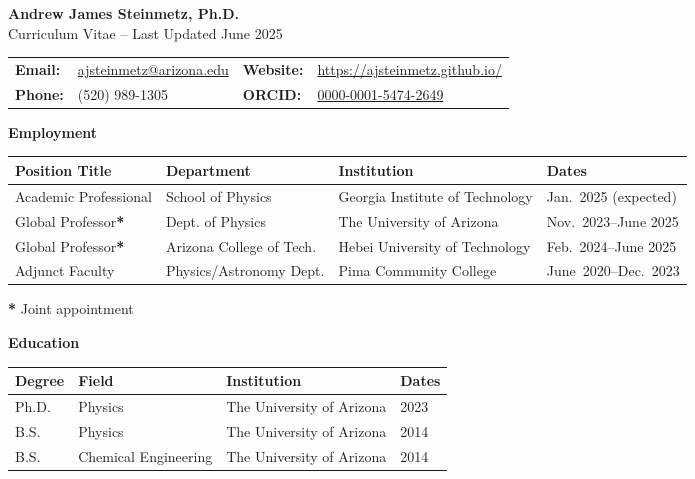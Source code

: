 \documentclass[11pt]{article}
\begin{document}
\begin{center}
    {\Large\textbf{Andrew James Steinmetz, Ph.D.}}\\[0.5em]
    {\large Curriculum Vitae -- Last Updated June 2025}
\end{center}

{\normalsize
\begin{center}
    \begin{tabular}{@{}p{2.0cm} p{5.0cm} p{2.0cm} p{5.0cm}@{}}
        \textbf{Email:} & \href{mailto:ajsteinmetz@arizona.edu}{ajsteinmetz@arizona.edu} &
        \textbf{Website:} & \href{https://ajsteinmetz.github.io/}{https://ajsteinmetz.github.io/} \\
        \textbf{Phone:} & (520) 989-1305 &
        \textbf{ORCID:} & \href{https://orcid.org/0000-0001-5474-2649}{0000-0001-5474-2649} \\
    \end{tabular}
\end{center}
}

\medskip

{\Large\textbf{Employment}}

{\normalsize
\begin{tabular}{@{}p{3.8cm} p{4.4cm} p{5.3cm} p{3.0cm}@{}}
    \toprule
    \textbf{Position Title} & \textbf{Department} & \textbf{Institution} & \textbf{Dates} \\
    \midrule
    Academic Professional & School of Physics & Georgia Institute of Technology & {\footnotesize Jan.~2025 (expected)} \\ 
    Global Professor\textbf{*} & Dept. of Physics & The University of Arizona              & {\footnotesize Nov.~2023--June 2025} \\
    Global Professor\textbf{*} & Arizona College of Tech. & Hebei University of Technology & {\footnotesize Feb.~2024--June 2025} \\
    Adjunct Faculty  & Physics/Astronomy Dept. & Pima Community College       & {\footnotesize June~2020--Dec.~2023} \\
    \bottomrule
\end{tabular}
}

\textbf{*} Joint appointment

\medskip

{\Large\textbf{Education}}

{\normalsize
\begin{tabular}{@{}p{2.8cm} p{5.0cm} p{5.5cm} p{3.2cm}@{}}
    \toprule
    \textbf{Degree} & \textbf{Field} & \textbf{Institution} & \textbf{Dates} \\
    \midrule
    Ph.D. & Physics             & The University of Arizona & 2023 \\
    B.S.   & Physics             & The University of Arizona & 2014 \\
    B.S.   & Chemical Engineering& The University of Arizona & 2014 \\
    \bottomrule
\end{tabular}
}
\end{document}
